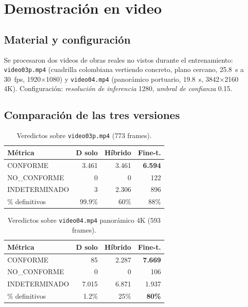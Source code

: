 \documentclass[conference]{IEEEtran}
\begin{document}
\section{Demostración en video}

\subsection{Material y configuración}

Se procesaron dos videos de obras reales no vistos durante el
entrenamiento: \texttt{video03p.mp4} (cuadrilla colombiana
vertiendo concreto, plano cercano, 25.8~s a 30~fps,
1920$\times$1080) y \texttt{video04.mp4} (panorámico portuario,
19.8~s, 3842$\times$2160 4K). Configuración: \textit{resolución de
inferencia} 1280, \textit{umbral de confianza} 0.15.

\subsection{Comparación de las tres versiones}

\begin{table}[h]
\centering
\caption{Veredictos sobre \texttt{video03p.mp4} (773 frames).}
\label{tab:video03}
\renewcommand{\arraystretch}{1.15}
\begin{tabular}{l r r r}
\toprule
\textbf{Métrica} & \textbf{D solo} & \textbf{Híbrido} & \textbf{Fine-t.} \\
\midrule
CONFORME & 3.461 & 3.461 & \textbf{6.594} \\
NO\_CONFORME & 0 & 0 & 122 \\
INDETERMINADO & 3 & 2.306 & 896 \\
\% definitivos & 99.9\% & 60\% & 88\% \\
\bottomrule
\end{tabular}
\end{table}

\begin{table}[h]
\centering
\caption{Veredictos sobre \texttt{video04.mp4} panorámico 4K
(593 frames).}
\label{tab:video04}
\renewcommand{\arraystretch}{1.15}
\begin{tabular}{l r r r}
\toprule
\textbf{Métrica} & \textbf{D solo} & \textbf{Híbrido} & \textbf{Fine-t.} \\
\midrule
CONFORME & 85 & 2.287 & \textbf{7.669} \\
NO\_CONFORME & 0 & 0 & 106 \\
INDETERMINADO & 7.015 & 6.871 & 1.937 \\
\% definitivos & 1.2\% & 25\% & \textbf{80\%} \\
\bottomrule
\end{tabular}
\end{table}
\end{document}
